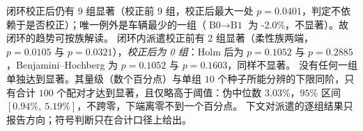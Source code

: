 \documentclass[manuscript,screen,review]{acmart}
\newcommand{\NCases}{10}
\newcommand{\NSeeds}{10}
\newcommand{\NPairs}{100}
\newcommand{\HLProbeLoop}{3.03\%}
\newcommand{\CIProbeLoop}{$[0.94\%,\ 5.19\%]$}
\newcommand{\CellsSigLoop}{9}
\newcommand{\CellsSigLoopAdj}{9}
\newcommand{\CellsSigProbe}{2}
\newcommand{\CellsSigProbeAdj}{0}
\newcommand{\GainLoopStarve}{-2.0\%}     %
\newcommand{\PProbeFlexLoRaw}{=0.0105}
\newcommand{\PProbeFlexLoHolm}{=0.1052}
\newcommand{\PProbeFlexLoBH}{=0.1052}
\newcommand{\PProbeFlexHiRaw}{=0.0321}
\newcommand{\PProbeFlexHiHolm}{=0.2885}
\newcommand{\PProbeFlexHiBH}{=0.1603}
\newcommand{\PLoopCellMax}{=0.0401}
\begin{document}
闭环校正后仍有 \CellsSigLoopAdj{} 组显著（校正前 \CellsSigLoop{} 组，校正后最大一处 $p\PLoopCellMax$，判定不依赖于是否校正）；唯一例外是车辆最少的一组（$\text{B0}\to\text{B1}$ 为 \GainLoopStarve{}，不显著）。故闭环的趋势可按族解读。
闭环内派遣校正前有 \CellsSigProbe{} 组显著（柔性族两端，$p\PProbeFlexLoRaw$ 与 $p\PProbeFlexHiRaw$），\emph{校正后为 \CellsSigProbeAdj{} 组}：Holm 后为 $p\PProbeFlexLoHolm$ 与 $p\PProbeFlexHiHolm$，Benjamini--Hochberg 为 $p\PProbeFlexLoBH$ 与 $p\PProbeFlexHiBH$，同样不显著。
没有任何一组单独达到显著。其量级（数个百分点）与单组 $\NSeeds$ 个种子所能分辨的下限同阶，只有合计 $\NPairs$ 个配对才达到显著，且仅略高于阈值：伪中位数 \HLProbeLoop{}，$95\%$ 区间 \CIProbeLoop{}，不跨零，下端离零不到一个百分点。
下文对派遣的逐组结果只报告方向；符号判断只在合计口径上给出。

\begin{table}[t]
\caption{逐组的四级阶梯结果与闭环、派遣两个效应，按三族分块（每组 $n=\NSeeds$ 个按种子配对的比较）。
显著性标记按 \textbf{Holm 校正后}的 $p$ 给出（双侧 Wilcoxon 符号秩检验），族为一个效应的
$\NCases$ 组：$^{*}p<0.05$、$^{**}p<0.01$；$^{\dagger}$ 表示校正前显著、校正后不显著，该组符号不作结论。
负值表示完工时间下降。两个增益列与表~\ref{tab:main} 为同一估计量（逐对相对增益在种子上的均值），不能由同行两个均值相除得到。
\texttt{A funnel} 同时是 B 族 $N_A/N_M=1.5$ 与 C 族 $F=0.6$，只运行一次，只列一行。}
\label{tab:bytag}
\small

\end{table}
\end{document}
